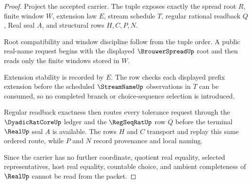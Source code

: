 \begin{proof}
Project the accepted carrier. The tuple exposes exactly the spread root $R$, finite window $W$, extension law $E$, stream schedule $T$, regular rational readback $Q$, Real seal $A$, and structural rows $H,C,P,N$.

Root compatibility and window discipline follow from the tuple order. A public real-name request begins with the displayed $\BrouwerSpreadUp$ root and then reads only the finite windows stored in $W$.

Extension stability is recorded by $E$. The row checks each displayed prefix extension before the scheduled $\StreamNameUp$ observations in $T$ can be consumed, so no completed branch or choice-sequence selection is introduced.

Regular readback exactness then routes every tolerance request through the $\DyadicRatCoreUp$ ledger and the $\RegSeqRatUp$ row $Q$ before the terminal $\RealUp$ seal $A$ is available. The rows $H$ and $C$ transport and replay this same ordered route, while $P$ and $N$ record provenance and local naming.

Since the carrier has no further coordinate, quotient real equality, selected representatives, host real equality, countable choice, and ambient completeness of $\RealUp$ cannot be read from the packet.
\end{proof}

